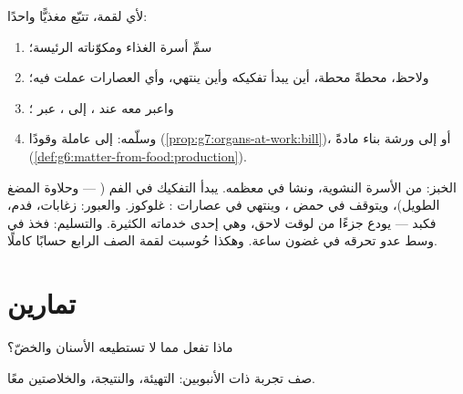 \begin{method}\label{met:g7:digestion-and-nutrients:trace}
لأي لقمة، تتبّع مغذيًّا واحدًا:
\begin{enumerate}
  \item سمِّ أسرة الغذاء ومكوّناته الرئيسة؛
  \item ولاحظ، محطةً محطة، أين يبدأ تفكيكه وأين ينتهي، وأي
        العصارات عملت فيه؛
  \item واعبر معه عند ، إلى ، عبر ؛
  \item وسلّمه: إلى  عاملة وقودًا
        (\cref{prop:g7:organs-at-work:bill})، أو إلى ورشة بناء
        مادةً (\cref{def:g6:matter-from-food:production}).
\end{enumerate}
\end{method}

\begin{example}\label{ex:g7:digestion-and-nutrients:breadtrace}
الخبز: من الأسرة النشوية، ونشا في معظمه. يبدأ التفكيك في الفم
( --- وحلاوة المضغ الطويل)، ويتوقف في حمض ، وينتهي في
عصارات : غلوكوز. والعبور: زغابات، فدم، فكبد ---
 يودع جزءًا من  لوقت لاحق، وهي إحدى خدماته الكثيرة.
والتسليم:  فخذ في وسط عدو تحرقه في غضون ساعة. وهكذا حُوسبت
لقمة الصف الرابع حسابًا كاملًا.
\end{example}

\section{تمارين}

\begin{exercise}[$\star$]\label{exo:g7:digestion-and-nutrients:1}
ماذا تفعل  مما لا تستطيعه الأسنان والخضّ؟
\end{exercise}

\begin{exercise}[$\star$]\label{exo:g7:digestion-and-nutrients:2}
صف تجربة  ذات الأنبوبين: التهيئة، والنتيجة، والخلاصتين
معًا.
\end{exercise}

